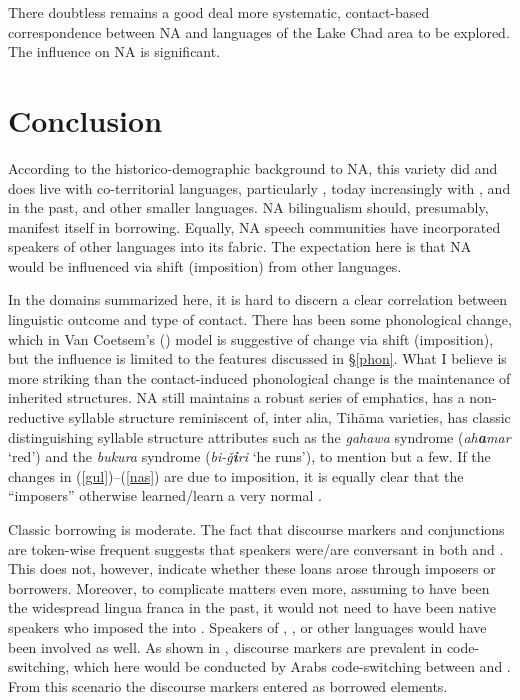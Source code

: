 \documentclass[output=paper]{langsci/langscibook}
\begin{document}
There doubtless remains a good deal more systematic, contact-based correspondence between NA and languages of the {Lake Chad} area to be explored. The influence on NA is significant.

\section{Conclusion
} \label{conc}

According to the historico-demographic background to NA, this variety did and does live with co-territorial languages, particularly , today increasingly with , and in the past,  and other smaller languages. NA {bilingualism} should, presumably, manifest itself in borrowing. Equally, NA speech communities have incorporated speakers of other languages into its fabric. The expectation here is that NA would be influenced via shift ({imposition}) from other languages.

In the domains summarized here, it is hard to discern a clear correlation between linguistic outcome and type of contact. There has been some phonological change, which in Van Coetsem’s (\citeyear{VanCoetsem1988,VanCoetsem2000}) model is suggestive of change via shift ({imposition}), but the influence is limited to the features discussed in §\ref{phon}. What I believe is more striking than the contact-induced phonological change is the maintenance of inherited structures. NA still maintains a robust series of emphatics, has a non-reductive syllable structure reminiscent of, inter alia, Tihāma varieties, has classic distinguishing syllable structure attributes such as the \textit{gahawa} syndrome (\textit{ah}\textbf{\textit{a}}\textit{mar} ‘red’) and the \textit{bukura} syndrome (\textit{bi-ǧ}\textbf{\textit{i}}\textit{ri} ‘he runs’), to mention but a few. If the changes in (\ref{gul})–(\ref{nas}) are due to {imposition}, it is equally clear that the “imposers” otherwise learned/learn a very normal .


Classic borrowing is moderate. The fact that discourse markers and conjunctions are token-wise frequent suggests that speakers were/are conversant in both  and . This does not, however, indicate whether these loans arose through imposers or borrowers. Moreover, to complicate matters even more, assuming  to have been the widespread lingua franca in the past, it would not need to have been native  speakers who imposed the  into . Speakers of , ,  or other languages would have been involved as well. As shown in \citet{OwensHassan2010}, discourse markers are prevalent in {code-switching}, which here would be conducted by Arabs {code-switching} between  and . From this scenario the discourse markers entered as borrowed elements.
\end{document}
